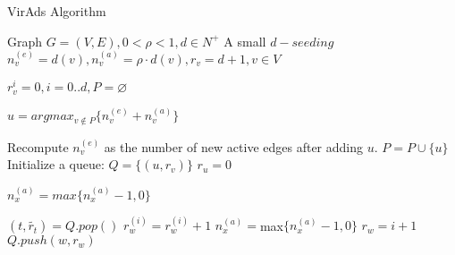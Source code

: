 \begin{algorithm}
	\caption{VirAds Algorithm}
	\begin{algorithmic}[1]
		
		
		\Require Graph $G = (V,E),0<\rho<1,d\in N^{+}$
		\Ensure A small $d-seeding$ 
		\State $n_{v}^{(e)} = d(v),n_{v}^{(a)} = \rho \cdot d(v), r_{v}  = d + 1, v \in V $
		
		\State $r_{v}^{i}=0, i=0..d, P  = \varnothing $
		
		
		\Repeat
		\State $u  = argmax_{v\not\in P}\{n_{v}^{(e)}+n_{v}^{(a)}\}$ 
		
		Recompute $n_{v}^{(e)}$ as the number of new active edges after adding $u$.
		\State $P  = P \cup \{u\} $
		\State Initialize a queue: $Q  = \{(u,r_{v})\} $
		\State $r_u = 0 $
		
		\State $n_{x}^{(a)}  = max\{n_{x}^{(a)}-1,0\} $
		
		\EndFor
		\State$(t,\widetilde{r_{t}})  = Q.pop() $
		\State $r_{w}^{(i)}=r_{w}^{(i)}+1 $
		\State $n_{x}^{(a)} =$max$\{n_{x}^{(a)}-1,0\} $	
		\EndFor
		\State $r_{w}=i+1 $
		\State $Q.push(w,r_{w}) $	
		\EndIf
		\EndIf
		\EndFor
		\EndFor
		\EndWhile
		\EndWhile
	\end{algorithmic}
\end{algorithm}
